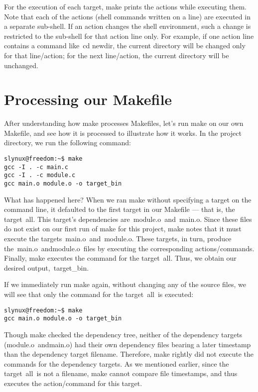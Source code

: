 \documentclass[output=paper, 
colorlinks,
citecolor=brown,
newtxmath
]{langscibook}
\begin{document}
For the execution of each target, make prints the actions while executing them. Note that each of the actions (shell commands written on a line) are executed in a separate sub-shell. If an action changes the shell environment, such a change is restricted to the sub-shell for that action line only. For example, if one action line contains a command like cd newdir, the current directory will be changed only for that line/action; for the next line/action, the current directory will be unchanged.

\section {Processing our Makefile}

After understanding how make processes Makefiles, let’s run make on our own Makefile, and see how it is processed to illustrate how it works. In the project directory, we run the following command:

\begin{verbatim}
slynux@freedom:~$ make
gcc -I . -c main.c
gcc -I . -c module.c
gcc main.o module.o -o target_bin
\end{verbatim}

What has happened here?
When we ran make without specifying a target on the command line, it defaulted to the first target in our Makefile — that is, the target all. This target’s dependencies are module.o and main.o. Since these files do not exist on our first run of make for this project, make notes that it must execute the targets main.o and module.o. These targets, in turn, produce the main.o andmodule.o files by executing the corresponding actions/commands. Finally, make executes the command for the target all. Thus, we obtain our desired output, target\_bin.

If we immediately run make again, without changing any of the source files, we will see that only the command for the target all is executed:

\begin{verbatim}
slynux@freedom:~$ make
gcc main.o module.o -o target_bin
\end{verbatim}

Though make checked the dependency tree, neither of the dependency targets (module.o andmain.o) had their own dependency files bearing a later timestamp than the dependency target filename. Therefore, make rightly did not execute the commands for the dependency targets. As we mentioned earlier, since the target all is not a filename, make cannot compare file timestamps, and thus executes the action/command for this target.
\end{document}
